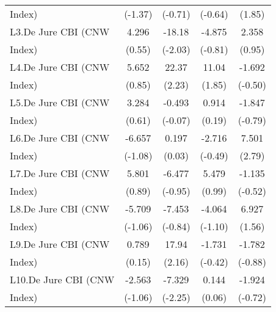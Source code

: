 {\begin{tabular}{l*{4}{c}}
Index)              &     (-1.37)         &     (-0.71)         &     (-0.64)         &      (1.85)         \\
[1em]
L3.De Jure CBI (CNW &       4.296         &      -18.18\sym{*}  &      -4.875         &       2.358         \\
Index)              &      (0.55)         &     (-2.03)         &     (-0.81)         &      (0.95)         \\
[1em]
L4.De Jure CBI (CNW &       5.652         &       22.37\sym{*}  &       11.04         &      -1.692         \\
Index)              &      (0.85)         &      (2.23)         &      (1.85)         &     (-0.50)         \\
[1em]
L5.De Jure CBI (CNW &       3.284         &      -0.493         &       0.914         &      -1.847         \\
Index)              &      (0.61)         &     (-0.07)         &      (0.19)         &     (-0.79)         \\
[1em]
L6.De Jure CBI (CNW &      -6.657         &       0.197         &      -2.716         &       7.501\sym{**} \\
Index)              &     (-1.08)         &      (0.03)         &     (-0.49)         &      (2.79)         \\
[1em]
L7.De Jure CBI (CNW &       5.801         &      -6.477         &       5.479         &      -1.135         \\
Index)              &      (0.89)         &     (-0.95)         &      (0.99)         &     (-0.52)         \\
[1em]
L8.De Jure CBI (CNW &      -5.709         &      -7.453         &      -4.064         &       6.927         \\
Index)              &     (-1.06)         &     (-0.84)         &     (-1.10)         &      (1.56)         \\
[1em]
L9.De Jure CBI (CNW &       0.789         &       17.94\sym{*}  &      -1.731         &      -1.782         \\
Index)              &      (0.15)         &      (2.16)         &     (-0.42)         &     (-0.88)         \\
[1em]
L10.De Jure CBI (CNW&      -2.563         &      -7.329\sym{*}  &       0.144         &      -1.924         \\
Index)              &     (-1.06)         &     (-2.25)         &      (0.06)         &     (-0.72)         \\

\end{tabular}}
